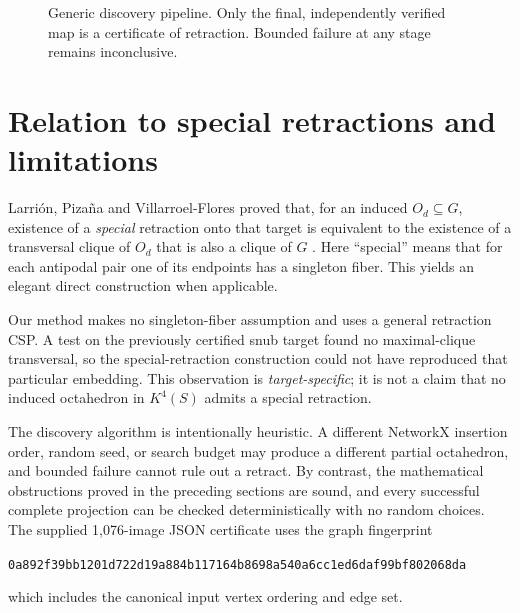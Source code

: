 \documentclass[11pt]{article}
\begin{document}
\begin{figure}[ht]
\centering
{}
\caption{Generic discovery pipeline. Only the final, independently verified map is a certificate of retraction. Bounded failure at any stage remains inconclusive.}
\label{fig:workflow}
\end{figure}

\section{Relation to special retractions and limitations}
Larri\'on, Piza\~na and Villarroel-Flores proved that, for an induced
\(O_d\subseteq G\), existence of a \emph{special} retraction onto
that target is equivalent to the existence of a transversal clique
of \(O_d\) that is also a clique of \(G\)
\cite[Theorem~3.7]{LarPizVil2019}. Here ``special'' means that for
each antipodal pair one of its endpoints has a singleton fiber.
This yields an elegant direct construction when applicable.

Our method makes no singleton-fiber assumption and uses a general
retraction CSP. A test on the previously certified snub target found
no maximal-clique transversal, so the special-retraction construction
could not have reproduced that particular embedding. This observation
is \emph{target-specific}; it is not a claim that no induced octahedron
in \(K^4(S)\) admits a special retraction.

The discovery algorithm is intentionally heuristic. A different
NetworkX insertion order, random seed, or search budget may produce a
different partial octahedron, and bounded failure cannot rule out a
retract. By contrast, the mathematical obstructions proved in the
preceding sections are sound, and every successful complete projection
can be checked deterministically with no random choices. The supplied
1,076-image JSON certificate uses the graph fingerprint
\begin{center}\small\texttt{0a892f39bb1201d722d19a884b117164b8698a540a6cc1ed6daf99bf802068da}\end{center}
which includes the canonical input vertex ordering and edge set.
\end{document}
